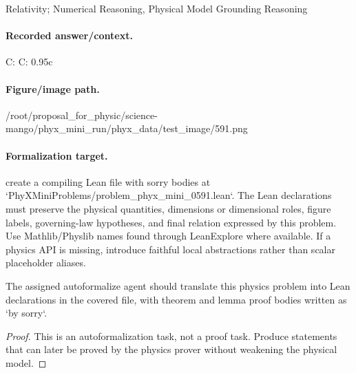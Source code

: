 Relativity; Numerical Reasoning, Physical Model Grounding Reasoning

\paragraph{Recorded answer/context.}
C: C: 0.95c

\paragraph{Figure/image path.}
/root/proposal\_for\_physic/science-mango/phyx\_mini\_run/phyx\_data/test\_image/591.png

\paragraph{Formalization target.}
create a compiling Lean file with sorry bodies at `PhyXMiniProblems/problem\_phyx\_mini\_0591.lean`. The Lean declarations must preserve the physical quantities, dimensions or dimensional roles, figure labels, governing-law hypotheses, and final relation expressed by this problem.
Use Mathlib/Physlib names found through LeanExplore where available. If a physics API is missing, introduce faithful local abstractions rather than scalar placeholder aliases.

\begin{theorem}
\label{thm:physics:phyx_mini_0591:target}
The assigned autoformalize agent should translate this physics problem into Lean declarations in the covered file, with theorem and lemma proof bodies written as `by sorry`.
\end{theorem}
\begin{proof}
This is an autoformalization task, not a proof task. Produce statements that can later be proved by the physics prover without weakening the physical model.
\end{proof}


